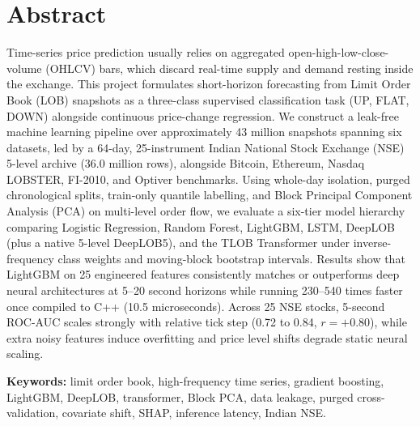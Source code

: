\documentclass[12pt,a4paper,oneside]{report}
\begin{document}
\setcounter{page}{1}

\chapter*{Abstract}

Time-series price prediction usually relies on aggregated open-high-low-close-volume (OHLCV) bars, which discard real-time supply and demand resting inside the exchange. This project formulates short-horizon forecasting from Limit Order Book (LOB) snapshots as a three-class supervised classification task (UP, FLAT, DOWN) alongside continuous price-change regression. We construct a leak-free machine learning pipeline over approximately 43 million snapshots spanning six datasets, led by a 64-day, 25-instrument Indian National Stock Exchange (NSE) 5-level archive (36.0 million rows), alongside Bitcoin, Ethereum, Nasdaq LOBSTER, FI-2010, and Optiver benchmarks. Using whole-day isolation, purged chronological splits, train-only quantile labelling, and Block Principal Component Analysis (PCA) on multi-level order flow, we evaluate a six-tier model hierarchy comparing Logistic Regression, Random Forest, LightGBM, LSTM, DeepLOB (plus a native 5-level DeepLOB5), and the TLOB Transformer under inverse-frequency class weights and moving-block bootstrap intervals. Results show that LightGBM on 25 engineered features consistently matches or outperforms deep neural architectures at 5--20 second horizons while running 230--540 times faster once compiled to C++ (10.5 microseconds). Across 25 NSE stocks, 5-second ROC-AUC scales strongly with relative tick step (0.72 to 0.84, $r = +0.80$), while extra noisy features induce overfitting and price level shifts degrade static neural scaling.

\vspace{0.5cm}
\noindent\textbf{Keywords:} limit order book, high-frequency time series, gradient boosting, LightGBM, DeepLOB, transformer, Block PCA, data leakage, purged cross-validation, covariate shift, SHAP, inference latency, Indian NSE.

\tableofcontents
\listoffigures
\listoftables

\clearpage
{}
\setcounter{page}{1}

\end{document}
